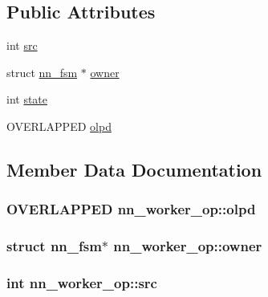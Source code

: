 \subsection*{Public Attributes}
\begin{DoxyCompactItemize}
\item 
int \hyperlink{structnn__worker__op_a6fe210f21ba1efbc04ab302e8de85a4b}{src}
\item 
struct \hyperlink{structnn__fsm}{nn\+\_\+fsm} $\ast$ \hyperlink{structnn__worker__op_ac614ac4cb45c9a576f2834c9e53a83b7}{owner}
\item 
int \hyperlink{structnn__worker__op_a25c39978f9c0ba61982f9f59ef17e89e}{state}
\item 
O\+V\+E\+R\+L\+A\+P\+P\+ED \hyperlink{structnn__worker__op_a7a1aa74348e1ff01bb488d87f42ad459}{olpd}
\end{DoxyCompactItemize}


\subsection{Member Data Documentation}
\subsubsection[{olpd}]{\setlength{\rightskip}{0pt plus 5cm}O\+V\+E\+R\+L\+A\+P\+P\+ED nn\+\_\+worker\+\_\+op\+::olpd}\hypertarget{structnn__worker__op_a7a1aa74348e1ff01bb488d87f42ad459}{}\label{structnn__worker__op_a7a1aa74348e1ff01bb488d87f42ad459}
\subsubsection[{owner}]{\setlength{\rightskip}{0pt plus 5cm}struct {\bf nn\+\_\+fsm}$\ast$ nn\+\_\+worker\+\_\+op\+::owner}\hypertarget{structnn__worker__op_ac614ac4cb45c9a576f2834c9e53a83b7}{}\label{structnn__worker__op_ac614ac4cb45c9a576f2834c9e53a83b7}
\subsubsection[{src}]{\setlength{\rightskip}{0pt plus 5cm}int nn\+\_\+worker\+\_\+op\+::src}\hypertarget{structnn__worker__op_a6fe210f21ba1efbc04ab302e8de85a4b}{}\label{structnn__worker__op_a6fe210f21ba1efbc04ab302e8de85a4b}
